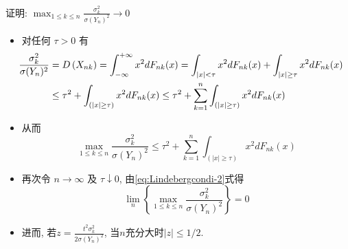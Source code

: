 \documentclass[Prob-All.tex]{subfiles}
\begin{document}
\begin{frame}{证明: $\max _{1 \leq k \leq n} \frac{\sigma_{k}^{2}}{\sigma(Y_n)^2}\rightarrow 0$}
	\vspace{-0.1cm}
\begin{itemize}
	\item 对任何 $\tau>0$ 有
\begin{align*}
	\hspace{-0.4cm}\frac{\sigma_{k}^{2}}{\sigma(Y_n)^2}&=D\left(X_{n k}\right)=\int_{-\infty}^{+\infty}x^2dF_{nk}(x)=\int_{|x|<\tau}x^2dF_{nk}(x)+\int_{|x|\geq\tau}x^2dF_{nk}(x)\\
	&\leq \tau^{2}+\int_{(|x| \geq \tau)} x^{2} d F_{n k}(x)\leq \tau^{2}+\sum_{k=1}^{n} \int_{(|x| \geq \tau)} x^{2} d F_{n k}(x)
\end{align*}
\item 从而
	\[
	\max _{1 \leq k \leq n} \frac{\sigma_{k}^{2}}{\sigma(Y_n)^2} \leq \tau^{2}+\sum_{k=1}^{n} \int_{(|x| \geq \tau)} x^{2} d F_{n k}(x)
	\]
\item
	再次令 $n \rightarrow \infty$ 及 $\tau \downarrow 0$, 由\eqref{eq:Lindebergcondi-2}式得
	\[
	\lim _{n}\left\{\max _{1 \leq k \leq n} \frac{\sigma_{k}^{2}}{\sigma(Y_n)^2}\right\}=0
	\]
	\item 进而, 若$z=\frac{t^{2} \sigma_{k}^{2}}{2 \sigma(Y_n)^2}$, 当$n$充分大时$|z| \leq 1 / 2$.
\end{itemize}

\end{frame}
\end{document}
